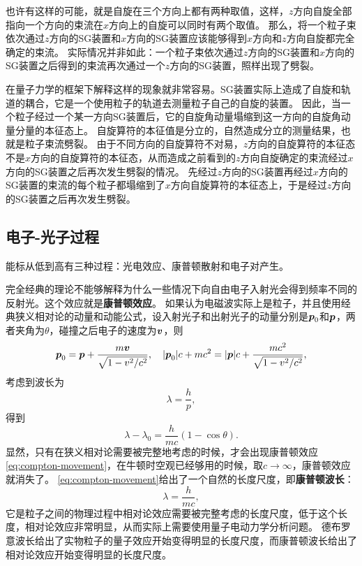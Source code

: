 \documentclass[UTF8, a4paper]{ctexart}
\begin{document}
也许有这样的可能，就是自旋在三个方向上都有两种取值，这样，$z$方向自旋全部指向一个方向的束流在$x$方向上的自旋可以同时有两个取值。
那么，将一个粒子束依次通过$z$方向的SG装置和$x$方向的SG装置应该能够得到$x$方向和$z$方向自旋都完全确定的束流。
实际情况并非如此：一个粒子束依次通过$z$方向的SG装置和$x$方向的SG装置之后得到的束流再次通过一个$z$方向的SG装置，照样出现了劈裂。

在量子力学的框架下解释这样的现象就非常容易。SG装置实际上造成了自旋和轨道的耦合，它是一个使用粒子的轨道去测量粒子自己的自旋的装置。
因此，当一个粒子经过一个某一方向SG装置后，它的自旋角动量塌缩到这一方向的自旋角动量分量的本征态上。
自旋算符的本征值是分立的，自然造成分立的测量结果，也就是粒子束流劈裂。
由于不同方向的自旋算符不对易，$z$方向的自旋算符的本征态不是$x$方向的自旋算符的本征态，从而造成之前看到的$z$方向自旋确定的束流经过$x$方向的SG装置之后再次发生劈裂的情况。
先经过$z$方向的SG装置再经过$x$方向的SG装置的束流的每个粒子都塌缩到了$x$方向自旋算符的本征态上，于是经过$z$方向的SG装置之后再次发生劈裂。

\subsection{电子-光子过程}

能标从低到高有三种过程：光电效应、康普顿散射和电子对产生。

完全经典的理论不能够解释为什么一些情况下向自由电子入射光会得到频率不同的反射光。这个效应就是\textbf{康普顿效应}。
如果认为电磁波实际上是粒子，并且使用经典狭义相对论的动量和动能公式，设入射光子和出射光子的动量分别是$\vb*{p}_0$和$\vb*{p}$，两者夹角为$\theta$，碰撞之后电子的速度为$\vb*{v}$，则
\[
    \vb*{p}_0 = \vb*{p} + \frac{m \vb*{v}}{\sqrt{1 - v^2/c^2}}, \quad \abs{\vb*{p}_0} c + m c^2 = \abs{\vb*{p}} c + \frac{m c^2}{\sqrt{1 - v^2/c^2}},
\]
考虑到波长为
\[
    \lambda = \frac{h}{p},
\]
得到
\begin{equation}
    \lambda - \lambda_0 = \frac{h}{mc} (1 - \cos \theta).
    \label{eq:compton-movement}
\end{equation}
显然，只有在狭义相对论需要被完整地考虑的时候，才会出现康普顿效应\eqref{eq:compton-movement}，在牛顿时空观已经够用的时候，取$c \to \infty$，康普顿效应就消失了。
\eqref{eq:compton-movement}给出了一个自然的长度尺度，即\textbf{康普顿波长}：
\begin{equation}
    \lambda = \frac{h}{mc},
\end{equation}
它是粒子之间的物理过程中相对论效应需要被完整考虑的长度尺度，低于这个长度，相对论效应非常明显，从而实际上需要使用量子电动力学分析问题。
德布罗意波长给出了实物粒子的量子效应开始变得明显的长度尺度，而康普顿波长给出了相对论效应开始变得明显的长度尺度。
\end{document}
